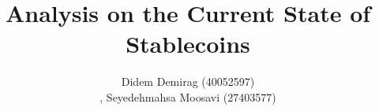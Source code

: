 \documentclass[envcountsect]{llncs}
\begin{document}
\frontmatter
\mainmatter

\title{Analysis on the Current State of Stablecoins}
\author{Didem Demirag (40052597) \\, Seyedehmahsa Moosavi (27403577)}




\maketitle











\clearpage
\end{document}
